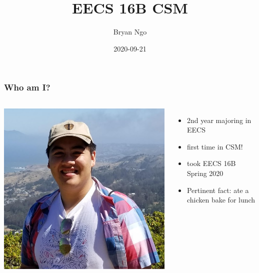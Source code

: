 \documentclass[aspectratio=169]{beamer}
\title{EECS 16B CSM}
\author{Bryan Ngo}
\date{2020-09-21}
\institute{Computer Science Mentors}
\begin{document}
\begin{frame}
    \maketitle
\end{frame}

\begin{frame}
    \tableofcontents
\end{frame}

\begin{frame}
    \frametitle{Who am I?}

    \begin{columns}
        \includegraphics[width=0.8\textheight]{bryan_ngo.png}

        \begin{itemize}
            \item 2nd year majoring in EECS
            \item first time in CSM!
            \item took EECS 16B Spring 2020
            \item Pertinent fact: ate a chicken bake for lunch
        \end{itemize}
    \end{columns}
\end{frame}
\end{document}
